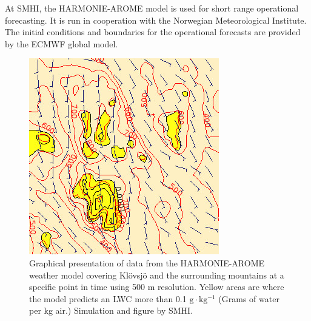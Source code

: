 At SMHI, the HARMONIE-AROME model is used for short range operational forecasting. It is run in cooperation with the Norwegian Meteorological Institute. The initial conditions and boundaries for the operational forecasts are provided by the ECMWF global model.

\begin{figure}%
\centering\includegraphics[width=0.6\linewidth]{figures/Images/Klovsjo_smhi160923_small}
\caption{Graphical presentation of data from the HARMONIE-AROME weather model covering Klövsjö and the surrounding mountains at a specific point in time using 500 m resolution. Yellow areas are where the model predicts an LWC more than 0.1 $\mathrm{g \cdot kg^{-1}}$ (Grams of water per kg air.) Simulation and figure by SMHI.}
\end{figure}




